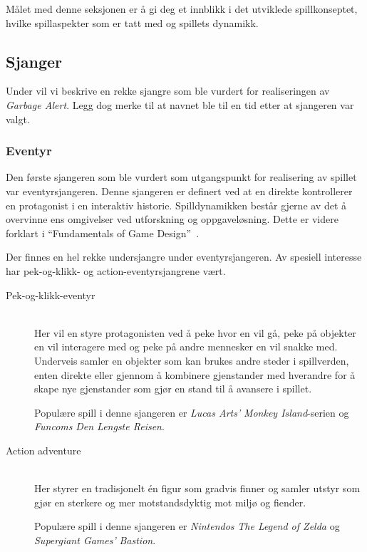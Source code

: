 Målet med denne seksjonen er å gi deg et innblikk i det utviklede
spillkonseptet, hvilke spillaspekter som er tatt med og spillets
dynamikk.


\subsection{Sjanger}\label{sec:genre}


Under vil vi beskrive en rekke sjangre som ble vurdert for realiseringen av \emph{Garbage Alert}. Legg dog merke til at navnet ble til en tid etter at sjangeren var valgt.

\subsubsection{Eventyr}
Den første sjangeren som ble vurdert som utgangspunkt for realisering av
spillet var eventyrsjangeren. Denne sjangeren er definert ved at en
direkte kontrollerer en protagonist i en interaktiv historie.
Spilldynamikken består gjerne av det å overvinne ens omgivelser ved
utforskning og oppgaveløsning. Dette er videre forklart i ``Fundamentals
of Game Design''~\cite{game_design}.

Der finnes en hel rekke undersjangre under eventyrsjangeren. Av spesiell interesse har pek-og-klikk- og action-eventyrsjangrene vært.

\begin{description}

	\item[Pek-og-klikk-eventyr] \hfill \\

	Her vil en styre protagonisten ved å peke hvor en vil gå, peke på objekter en vil interagere med og peke på andre mennesker en vil snakke med. Underveis samler en objekter som kan brukes andre steder i spillverden, enten direkte eller gjennom å kombinere gjenstander med hverandre for å skape nye gjenstander som gjør en  stand til å avansere i spillet.

	Populære spill i denne sjangeren er \emph{Lucas Arts'} \emph{Monkey Island}-serien og \emph{Funcoms} \emph{Den Lengste Reisen}.

	\item[Action adventure] \hfill \\

	Her styrer en tradisjonelt én figur som gradvis finner og samler utstyr som gjør en sterkere og mer motstandsdyktig mot miljø og fiender.


	Populære spill i denne sjangeren er \emph{Nintendos} \emph{The Legend of Zelda} og \emph{Supergiant Games'} \emph{Bastion}.

\end{description}

